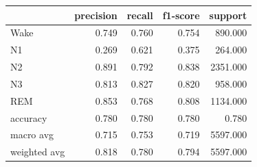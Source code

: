 \begin{tabular}{lrrrr}
\toprule
 & precision & recall & f1-score & support \\
\midrule
Wake & 0.749 & 0.760 & 0.754 & 890.000 \\
N1 & 0.269 & 0.621 & 0.375 & 264.000 \\
N2 & 0.891 & 0.792 & 0.838 & 2351.000 \\
N3 & 0.813 & 0.827 & 0.820 & 958.000 \\
REM & 0.853 & 0.768 & 0.808 & 1134.000 \\
accuracy & 0.780 & 0.780 & 0.780 & 0.780 \\
macro avg & 0.715 & 0.753 & 0.719 & 5597.000 \\
weighted avg & 0.818 & 0.780 & 0.794 & 5597.000 \\
\bottomrule
\end{tabular}
